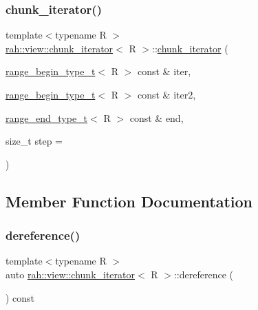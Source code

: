 \mbox{\label{structrah_1_1view_1_1chunk__iterator_a2675282334475c594c96fdcc6c646895}} 
\subsubsection{\texorpdfstring{chunk\_iterator()}{chunk\_iterator()}\hspace{0.1cm}{\footnotesize\ttfamily [2/2]}}
{\footnotesize\ttfamily template$<$typename R $>$ \\
\mbox{\hyperlink{structrah_1_1view_1_1chunk__iterator}{rah\+::view\+::chunk\+\_\+iterator}}$<$ R $>$\+::\mbox{\hyperlink{structrah_1_1view_1_1chunk__iterator}{chunk\+\_\+iterator}} (\begin{DoxyParamCaption}\item[{\mbox{\hyperlink{namespacerah_a28aff4eeddcece6be65ff0b956d32d4a}{range\+\_\+begin\+\_\+type\+\_\+t}}$<$ R $>$ const \&}]{iter,  }\item[{\mbox{\hyperlink{namespacerah_a28aff4eeddcece6be65ff0b956d32d4a}{range\+\_\+begin\+\_\+type\+\_\+t}}$<$ R $>$ const \&}]{iter2,  }\item[{\mbox{\hyperlink{namespacerah_a9657e24ae477f4482225b133fe286b65}{range\+\_\+end\+\_\+type\+\_\+t}}$<$ R $>$ const \&}]{end,  }\item[{size\+\_\+t}]{step = {} }\end{DoxyParamCaption})\hspace{0.3cm}{\ttfamily [inline]}}



\subsection{Member Function Documentation}
\mbox{\label{structrah_1_1view_1_1chunk__iterator_ad552c568bb914a6107bdcb19a5b9aa88}} 
\subsubsection{\texorpdfstring{dereference()}{dereference()}\hspace{0.1cm}{\footnotesize\ttfamily [1/2]}}
{\footnotesize\ttfamily template$<$typename R $>$ \\
auto \mbox{\hyperlink{structrah_1_1view_1_1chunk__iterator}{rah\+::view\+::chunk\+\_\+iterator}}$<$ R $>$\+::dereference (\begin{DoxyParamCaption}{ }\end{DoxyParamCaption}) const\hspace{0.3cm}{\ttfamily [inline]}}

